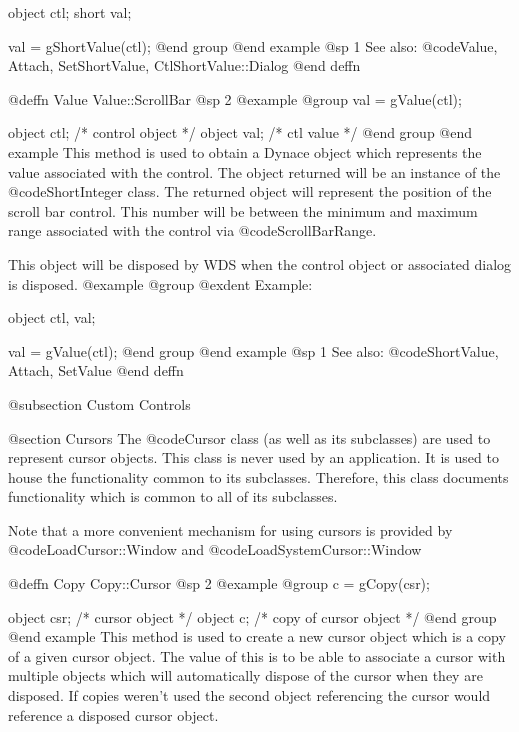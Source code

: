 object  ctl;
short   val;

val = gShortValue(ctl);
@end group
@end example
@sp 1
See also:  @code{Value, Attach, SetShortValue, CtlShortValue::Dialog}
@end deffn









@deffn {Value} Value::ScrollBar
@sp 2
@example
@group
val = gValue(ctl);

object  ctl;   /*  control object  */
object  val;   /*  ctl value       */
@end group
@end example
This method is used to obtain a Dynace object which represents the value
associated with the control.  The object returned will be an instance of
the @code{ShortInteger} class.  The returned object will represent
the position of the scroll bar control.  This number will be between
the minimum and maximum range associated with the control via
@code{ScrollBarRange}.

This object will be disposed by WDS when the control object or
associated dialog is disposed.
@example
@group
@exdent Example:

object  ctl, val;

val = gValue(ctl);
@end group
@end example
@sp 1
See also:  @code{ShortValue, Attach, SetValue}
@end deffn









@subsection Custom Controls


@section Cursors
The @code{Cursor} class (as well as its subclasses) are used to represent
cursor objects.  This class is never used by an application.  It is used
to house the functionality common to its subclasses.  Therefore, this
class documents functionality which is common to all of its subclasses.

Note that a more convenient mechanism for using cursors is provided by
@code{LoadCursor::Window} and @code{LoadSystemCursor::Window}









@deffn {Copy} Copy::Cursor
@sp 2
@example
@group
c = gCopy(csr);

object  csr;    /*  cursor object          */
object  c;      /*  copy of cursor object  */
@end group
@end example
This method is used to create a new cursor object which is a copy of a
given cursor object.  The value of this is to be able to associate a
cursor with multiple objects which will automatically dispose of the
cursor when they are disposed.  If copies weren't used the second object
referencing the cursor would reference a disposed cursor object.

